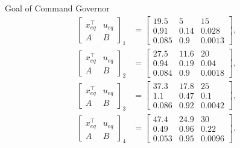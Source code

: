 \begin{slide}{Goal of Command Governor}
  \vspace*{\fill}
  \begin{equation}
    \begin{aligned}
      \label{eq:op-points}
      \left[\begin{array}{c|c}
          x_{eq}^{\top} & u_{eq} \\
          \hline
          A             & B
        \end{array}\right]_{1} & = \left[\begin{array}{cc|c}
          19.5  & 5    & 15     \\
          \hline
          0.91  & 0.14 & 0.028  \\
          0.085 & 0.9  & 0.0013
        \end{array}\right], \\
      \left[\begin{array}{c|c}
          x_{eq}^{\top} & u_{eq} \\
          \hline
          A             & B
        \end{array}\right]_{2} & = \left[\begin{array}{cc|c}
          27.5  & 11.6 & 20     \\
          \hline
          0.94  & 0.19 & 0.04   \\
          0.084 & 0.9  & 0.0018
        \end{array}\right], \\
      \left[\begin{array}{c|c}
          x_{eq}^{\top} & u_{eq} \\
          \hline
          A             & B
        \end{array}\right]_{3} & = \left[\begin{array}{cc|c}
          37.3  & 17.8 & 25     \\
          \hline
          1.1   & 0.47 & 0.1    \\
          0.086 & 0.92 & 0.0042
        \end{array}\right], \\
      \left[\begin{array}{c|c}
          x_{eq}^{\top} & u_{eq} \\
          \hline
          A             & B
        \end{array}\right]_{4} & = \left[\begin{array}{cc|c}
          47.4  & 24.9 & 30     \\
          \hline
          0.49  & 0.96 & 0.22   \\
          0.053 & 0.95 & 0.0096
        \end{array}\right].
    \end{aligned}
  \end{equation}
  \vspace*{\fill}
\end{slide}

